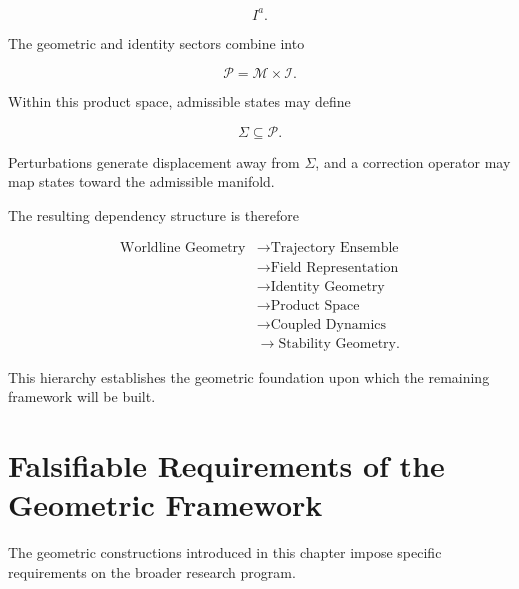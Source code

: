 \documentclass[12pt,oneside]{book}
\begin{document}
\begin{equation}
    I^a.
\end{equation}

The geometric and identity sectors combine into

\begin{equation}
    \mathcal{P}
    =
    \mathcal{M}
    \times
    \mathcal{I}.
\end{equation}

Within this product space, admissible states may define

\begin{equation}
    \Sigma
    \subseteq
    \mathcal{P}.
\end{equation}

Perturbations generate displacement away from \(\Sigma\), and
a correction operator may map states toward the admissible
manifold.

The resulting dependency structure is therefore

\begin{equation}
\boxed{
\begin{aligned}
    \text{Worldline Geometry}
    &\longrightarrow
    \text{Trajectory Ensemble}
    \\
    &\longrightarrow
    \text{Field Representation}
    \\
    &\longrightarrow
    \text{Identity Geometry}
    \\
    &\longrightarrow
    \text{Product Space}
    \\
    &\longrightarrow
    \text{Coupled Dynamics}
    \\
    &\longrightarrow
    \text{Stability Geometry}.
\end{aligned}
}
\label{eq:geometry-dependency-structure}
\end{equation}

This hierarchy establishes the geometric foundation upon which
the remaining framework will be built.


\section{Falsifiable Requirements of the Geometric Framework}
\label{sec:geometry-falsifiability}

The geometric constructions introduced in this chapter impose
specific requirements on the broader research program.
\end{document}
